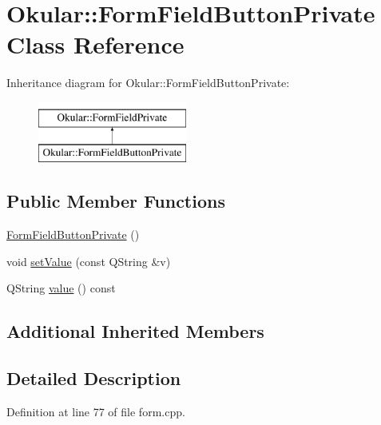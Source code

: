 \hypertarget{classOkular_1_1FormFieldButtonPrivate}{\section{Okular\+:\+:Form\+Field\+Button\+Private Class Reference}
\label{classOkular_1_1FormFieldButtonPrivate}
}
Inheritance diagram for Okular\+:\+:Form\+Field\+Button\+Private\+:\begin{figure}[H]
\begin{center}
\leavevmode
\includegraphics[height=2.000000cm]{classOkular_1_1FormFieldButtonPrivate}
\end{center}
\end{figure}
\subsection*{Public Member Functions}
\begin{DoxyCompactItemize}
\item 
\hyperlink{classOkular_1_1FormFieldButtonPrivate_a395dea8301bfebf18dc856a93bf5c40b}{Form\+Field\+Button\+Private} ()
\item 
void \hyperlink{classOkular_1_1FormFieldButtonPrivate_a1ee021b1ddd5872656eca0353e966c14}{set\+Value} (const Q\+String \&v)
\item 
Q\+String \hyperlink{classOkular_1_1FormFieldButtonPrivate_a3d75f359bdb5ba6afda7575029b65cf5}{value} () const 
\end{DoxyCompactItemize}
\subsection*{Additional Inherited Members}


\subsection{Detailed Description}


Definition at line 77 of file form.\+cpp.



